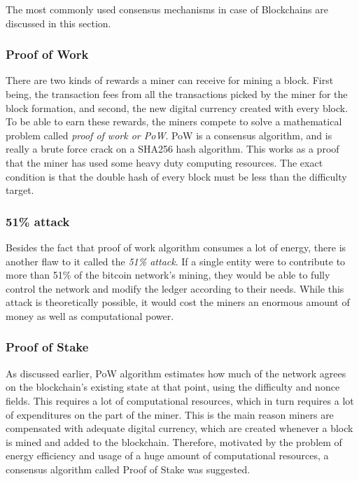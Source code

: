 \documentclass[english]{tktltiki}
\begin{document}
The most commonly used consensus mechanisms in case of Blockchains are discussed in this section.

\subsubsection{Proof of Work} \label{Section:PoW}

There are two kinds of rewards a miner can receive for mining a block. First being, the transaction fees from all the transactions picked by the miner for the block formation, and second, the new digital currency created with every block. To be able to earn these rewards, the miners compete to solve a mathematical problem called \textit{proof of work or PoW}. PoW is a consensus algorithm, and is really a brute force crack on a SHA256 hash algorithm. This works as a proof that the miner has used some heavy duty computing resources. The exact condition is that the double hash of every block must be less than the difficulty target\cite{eth-whitepaper}.

\subsubsection*{51\% attack}
Besides the fact that proof of work algorithm consumes a lot of energy, there is another flaw to it called the \textit{51\% attack}. If a single entity were to contribute to more than 51\% of the bitcoin network's mining, they would be able to fully control the network and modify the ledger according to their needs. While this attack is theoretically possible, it would cost the miners an enormous amount of money as well as computational power. 

\subsubsection{Proof of Stake}

As discussed earlier, PoW algorithm estimates how much of the network agrees on the blockchain's existing state at that point, using the difficulty and nonce fields. This requires a lot of computational resources, which in turn requires a lot of expenditures on the part of the miner. This is the main reason miners are compensated with adequate digital currency, which are created whenever a block is mined and added to the blockchain. Therefore, motivated by the problem of energy efficiency and usage of a huge amount of computational resources, a consensus algorithm called Proof of Stake was suggested. 
\end{document}
